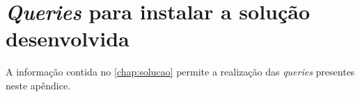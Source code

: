 \documentclass[11pt,twoside,a4paper]{report}
\begin{document}
%
%
\cleardoublepage



%  
%
%

\cleardoublepage
\appendix
\chapter{\textit{Queries} para instalar a solução desenvolvida}
\label{apen:queries}
A informação contida no \autoref{chap:solucao} permite a realização das \textit{queries} presentes neste apêndice.\par 
\end{document}
